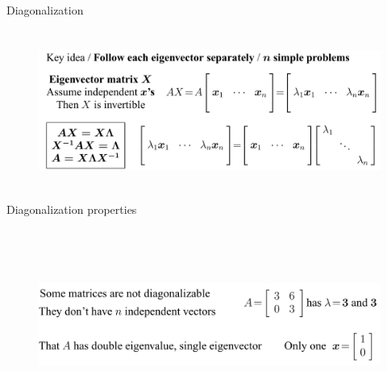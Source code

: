 \documentclass[aspectratio=169]{beamer}
\begin{document}

\begin{frame}[t]{Diagonalization}
\framesubtitle{}
    \begin{figure}[H]
        \centering\includegraphics[height=5cm,width=1\textwidth,keepaspectratio]{Diag.png}
        \label{fig:Diag.png}
    \end{figure}
\end{frame}


\begin{frame}[t]{Diagonalization properties}
\framesubtitle{}
    \begin{figure}[H]
        \centering\includegraphics[height=6cm,width=1\textwidth,keepaspectratio]{Diag_properties.png}
        \label{fig:Diag_properties.png}
    \end{figure}
\end{frame}
\end{document}
